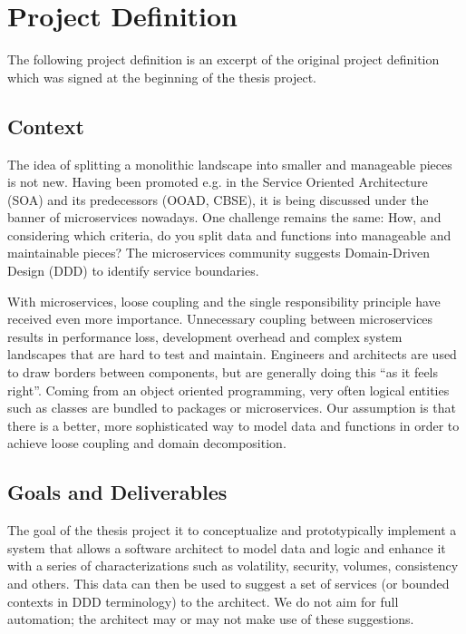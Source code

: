 \chapter{Project Definition}
\label{appendix:projectDefinition}

The following project definition is an excerpt of the original project definition which was signed at the beginning of the thesis project.

\section{Context}

The idea of splitting a monolithic landscape into smaller and manageable pieces is not new. Having been promoted e.g. in the Service Oriented Architecture (SOA) and its predecessors (OOAD, CBSE), it is being discussed under the banner of microservices nowadays. One challenge remains the same: How, and considering which criteria, do you split data and functions into manageable and maintainable pieces? The microservices community suggests Domain-Driven Design (DDD) to identify service boundaries. 

With microservices, loose coupling and the single responsibility principle have received even more importance. Unnecessary coupling between microservices results in performance loss, development overhead and complex system landscapes that are hard to test and maintain. Engineers and architects are used to draw borders between components, but are generally doing this \enquote{as it feels right}. Coming from an object oriented programming, very often logical entities such as classes are bundled to packages or microservices. Our assumption is that there is a better, more sophisticated way to model data and functions in order to achieve loose coupling and domain decomposition.

\section{Goals and Deliverables}
	
The goal of the thesis project it to conceptualize and prototypically implement a system that allows a software architect to model data and logic and enhance it with a series of characterizations such as volatility, security, volumes, consistency and others. This data can then be used to suggest a set of services (or bounded contexts in DDD terminology) to the architect. We do not aim for full automation; the architect may or may not make use of these suggestions. 

